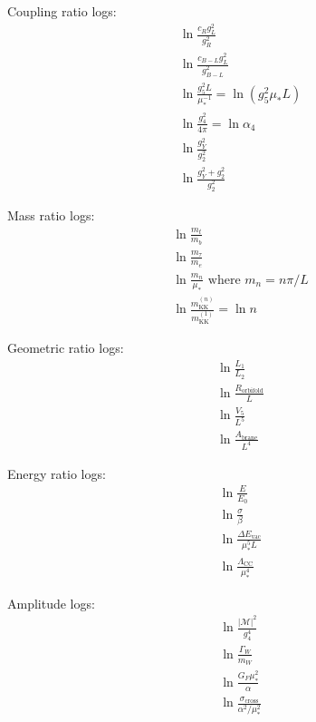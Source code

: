 \documentclass[11pt,a4paper]{article}
\begin{document}
Coupling ratio logs:
\begin{align}
\label{eq:log-coup-1} &\ln\frac{c_R g_L^2}{g_R^2} \\
\label{eq:log-coup-2} &\ln\frac{c_{B-L} g_L^2}{g_{B-L}^2} \\
\label{eq:log-coup-3} &\ln\frac{g_5^2 L}{\mu_*^{-1}} = \ln(g_5^2 \mu_* L) \\
\label{eq:log-coup-4} &\ln\frac{g_4^2}{4\pi} = \ln\alpha_4 \\
\label{eq:log-coup-5} &\ln\frac{g_Y^2}{g_2^2} \\
\label{eq:log-coup-6} &\ln\frac{g_Y^2 + g_2^2}{g_2^2}
\end{align}

Mass ratio logs:
\begin{align}
\label{eq:log-mass-1} &\ln\frac{m_t}{m_b} \\
\label{eq:log-mass-2} &\ln\frac{m_{\tau}}{m_e} \\
\label{eq:log-mass-3} &\ln\frac{m_n}{\mu_*} \text{ where } m_n = n\pi/L \\
\label{eq:log-mass-4} &\ln\frac{m_{\text{KK}}^{(n)}}{m_{\text{KK}}^{(1)}} = \ln n
\end{align}

Geometric ratio logs:
\begin{align}
\label{eq:log-geom-1} &\ln\frac{L_1}{L_2} \\
\label{eq:log-geom-2} &\ln\frac{R_{\text{orbifold}}}{L} \\
\label{eq:log-geom-3} &\ln\frac{V_5}{L^5} \\
\label{eq:log-geom-4} &\ln\frac{A_{\text{brane}}}{L^4}
\end{align}

Energy ratio logs:
\begin{align}
\label{eq:log-energy-1} &\ln\frac{E}{E_0} \\
\label{eq:log-energy-2} &\ln\frac{\sigma}{\beta} \\
\label{eq:log-energy-3} &\ln\frac{\Delta E_{\text{vac}}}{\mu_*^5 L} \\
\label{eq:log-energy-4} &\ln\frac{\Lambda_{\text{CC}}}{\mu_*^4}
\end{align}

Amplitude logs:
\begin{align}
\label{eq:log-amp-1} &\ln\frac{|\mathcal{M}|^2}{g_4^4} \\
\label{eq:log-amp-2} &\ln\frac{\Gamma_W}{m_W} \\
\label{eq:log-amp-3} &\ln\frac{G_F \mu_*^2}{\alpha} \\
\label{eq:log-amp-4} &\ln\frac{\sigma_{\text{cross}}}{\alpha^2/\mu_*^2}
\end{align}
\end{document}
